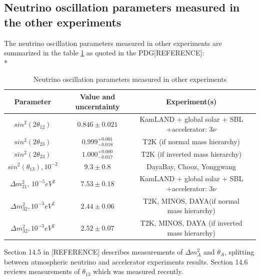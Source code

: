\subsection{Neutrino oscillation parameters measured in the other experiments}
The neutrino oscillation parameters measured in other experiments are summarized in the table \ref{tab:MeasuredPars} as quoted in the PDG[REFERENCE]:\\*
\begin{table}[h]
  \begin{center}
  \caption{ Neutrino oscillation parameters measured in other experiments}
  \begin{tabular}{|c|c|c|c|}
     Parameter & Value and uncerntainty & Experiment(s) \\ \hline
     $sin^2(2\theta_{12})$ &  $0.846\pm0.021$  &  KamLAND + global solar + SBL +accelerator: 3$\nu$  \\ \hline 
     $sin^2(2\theta_{23})$ &  $0.999^{+0.001}_{-0.018}$  &  T2K (if normal mass hierarchy)   \\ \hline 
     $sin^2(2\theta_{23})$ &  $1.000^{+0.000}_{-0.017}$  &  T2K (if inverted mass hierarchy)   \\ \hline 
     $sin^2(\theta_{13}), 10^{-2}$ &  $9.3\pm0.8$  &  DayaBay, Chooz, Yonggwang    \\ \hline 
     ${\Delta}m^2_{21}$, $10^{-5} eV^2$ &  $7.53\pm0.18$  &  KamLAND + global solar + SBL +accelerator: 3$\nu$   \\ \hline 
     ${\Delta}m^2_{32}, 10^{-3} eV^2$ &  $2.44\pm0.06$  &  T2K, MINOS, DAYA(if normal mass hierarchy)     \\ \hline
     ${\Delta}m^2_{32}, 10^{-3} eV^2$ &  $2.52\pm0.07$  &  T2K, MINOS, DAYA (if inverted mass hierarchy)     \\ \hline 
  \end{tabular}
  \label{tab:MeasuredPars}
  \end{center}
\end{table}

Section 14.5 in [REFERENCE] describes measurements of $\Delta{m^2_A}$ and $\theta_A$, splitting between atmospheric neutrino and accelerator experiments results. Section 14.6 reviews measurements of $\theta_{13}$ which was measured recently.

